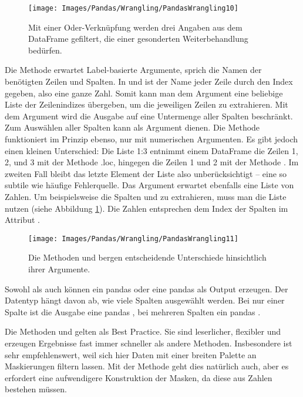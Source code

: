 \begin{figure}
    \centering
    \texttt{[image: Images/Pandas/Wrangling/PandasWrangling10]}    
    \caption{Mit einer Oder-Verknüpfung werden drei Angaben aus dem DataFrame gefiltert, die einer gesonderten Weiterbehandlung bedürfen.} \label{PandasWrangling10}
\end{figure}

Die Methode  erwartet Label-basierte Argumente, sprich die Namen der benötigten Zeilen und Spalten. In  und  ist der Name jeder Zeile durch den Index gegeben, also eine ganze Zahl. Somit kann man dem Argument  eine beliebige Liste der Zeilenindizes übergeben, um die jeweiligen Zeilen zu extrahieren. Mit dem Argument  wird die Ausgabe auf eine Untermenge aller Spalten beschränkt. Zum Auswählen aller Spalten kann \PYTHON{:} als Argument dienen. Die Methode  funktioniert im Prinzip ebenso, nur mit numerischen Argumenten. Es gibt jedoch einen kleinen Unterschied: Die Liste 1:3 entnimmt einem DataFrame die Zeilen 1, 2, und 3 mit der Methode .loc, hingegen die Zeilen 1 und 2 mit der Methode . Im zweiten Fall bleibt das letzte Element der Liste also unberücksichtigt -- eine so subtile wie häufige Fehlerquelle. Das Argument  erwartet ebenfalls eine Liste von Zahlen. Um beispielsweise die Spalten  und  zu extrahieren, muss man die Liste \PYTHON{[1, 6]} nutzen (siehe Abbildung \ref{PandasWrangling10}). Die Zahlen entsprechen dem Index der Spalten im Attribut .

\begin{figure}
    \centering
    \texttt{[image: Images/Pandas/Wrangling/PandasWrangling11]}    
    \caption{Die Methoden  und  bergen entscheidende Unterschiede hinsichtlich ihrer Argumente.} \label{PandasWrangling11}
\end{figure}


Sowohl  als auch  können ein pandas  oder eine pandas  als Output erzeugen. Der Datentyp hängt davon ab, wie viele Spalten ausgewählt werden. Bei nur einer Spalte ist die Ausgabe eine pandas , bei mehreren Spalten ein pandas .

Die Methoden  und  gelten als Best Practice. Sie sind leserlicher, flexibler und erzeugen Ergebnisse fast immer schneller als andere Methoden. Insbesondere  ist sehr empfehlenswert, weil sich hier Daten mit einer breiten Palette an Maskierungen filtern lassen. Mit der Methode  geht dies natürlich auch, aber es erfordert eine aufwendigere Konstruktion der Masken, da diese aus Zahlen bestehen müssen.

